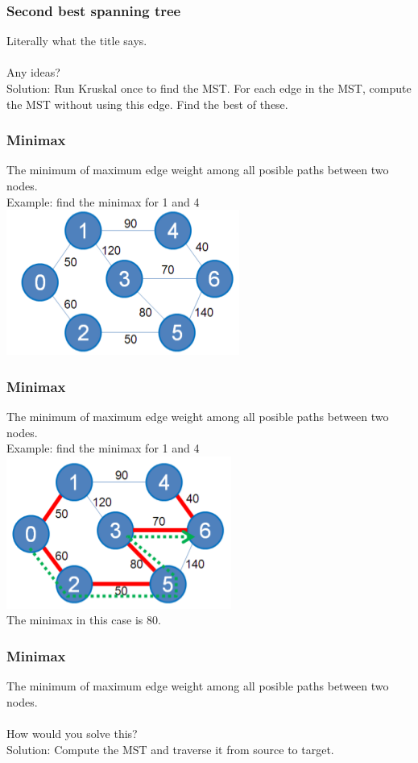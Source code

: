 \documentclass[12pt]{beamer}
\begin{document}
\begin{frame}
	\frametitle{Second best spanning tree}
	Literally what the title says.\\~\\
	Any ideas?\\
	\pause
	Solution: Run Kruskal once to find the MST. For each edge in the MST, compute the MST without using this edge. Find the best of these.
	
\end{frame}

\begin{frame}
	\frametitle{Minimax}
	The minimum of maximum edge weight among all posible paths between two nodes.\\
	Example: find the minimax for 1 and 4\\
	\includegraphics[width=0.6\linewidth]{img/minimax-graph}
\end{frame}

\begin{frame}
	\frametitle{Minimax}
	The minimum of maximum edge weight among all posible paths between two nodes.\\
	Example: find the minimax for 1 and 4\\
	\includegraphics[width=0.6\linewidth]{img/minimax-graph-correct}\\
	The minimax in this case is 80.
\end{frame}

\begin{frame}
	\frametitle{Minimax}
	The minimum of maximum edge weight among all posible paths between two nodes.\\~\\
	How would you solve this?\\
	Solution: Compute the MST and traverse it from source to target.
\end{frame}
\end{document}

